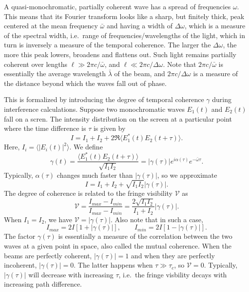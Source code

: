 \documentclass[11pt]{article}
\newcommand\E[1]{\langle #1 \rangle}
\begin{document}
        A quasi-monochromatic, partially coherent wave has a spread of frequencies $\omega$. This means that its Fourier transform
        looks like a sharp, but finitely thick, peak centered at the mean frequency $\bar{\omega}$ and having a width of $\Delta\omega$,
        which is a measure of the spectral width, i.e.\ range of frequencies/wavelengths of the light, which in turn is inversely
        a measure of the temporal coherence. The larger the $\Delta\omega$, the more this peak lowers, broadens and flattens out.
        Such light remains partially coherent over lengths $\ell \gg 2\pi c/\bar{\omega}$, and $\ell \ll 2\pi c /\Delta\omega$.
        Note that $2\pi c /\bar{\omega}$ is essentially the average wavelength $\bar{\lambda}$ of the beam, and $2\pi c /\Delta\omega$ is a measure
        of the distance beyond which the waves fall out of phase.

        This is formalized by introducing the degree of temporal coherence $\gamma$ during interference calculations. Suppose two monochromatic waves 
        $E_1(t)$ and $E_2(t)$ fall on a scren. The intensity distribution on the screen at a particular point where the time difference is $\tau$
        is given by
        \[
                I = I_1 + I_2 + 2\Re \E{E_1^*(t) E_2(t + \tau)}.
        \]
        Here, $I_i = \E{|E_i(t)|^2}$. We define
        \[
                \gamma(t) = \frac{\E{E_1^*(t)E_2(t + \tau)}}{\sqrt{I_1I_2}} = |\gamma(\tau)|e^{i\alpha(\tau)}e^{-\bar{\omega}\tau}.
        \]
        Typically, $\alpha(\tau)$ changes much faster than $|\gamma(\tau)|$, so we approximate
        \[
                I = I_1 + I_2 + \sqrt{I_1I_2}|\gamma(\tau)|.
        \]
        The degree of coherence is related to the fringe visibility $\mathcal{V}$ as
        \[
                \mathcal{V} = \frac{I_{max} - I_{min}}{I_{max} - I_{min}} = \frac{2\sqrt{I_1I_2}}{I_1 + I_2}|\gamma(\tau)|.
        \]
        When $I_1 = I_2$, we have $\mathcal{V} = |\gamma(\tau)|$.
        Also note that in such a case,
        \[
                I_{max} = 2I[1 + |\gamma(\tau)|], \qquad
                I_{min} = 2I[1 - |\gamma(\tau)|].
        \]
        The factor $\gamma(\tau)$ is essentially a measure of the correlation between the two waves at a given point in space, also
        called the mutual coherence. When the beams are perfectly coherent, $|\gamma(\tau)| = 1$ and when they are perfectly incoherent,
        $|\gamma(\tau)| = 0$. The latter happens when $\tau \gg \tau_c$, so $\mathcal{V} = 0$.
        Typically, $|\gamma(\tau)|$ will decrease with increasing $\tau$, i.e.\ the fringe visbility decays with increasing path difference.
\end{document}

